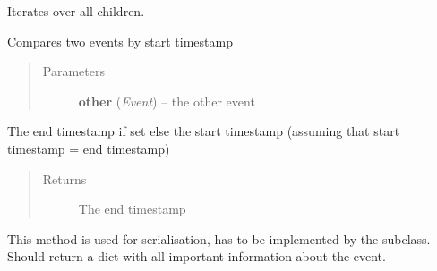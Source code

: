 \documentclass[letterpaper,10pt,english]{sphinxmanual}
\begin{document}
\begin{fulllineitems}
\begin{fulllineitems}
\end{fulllineitems}


\begin{fulllineitems}
\label{ambrosia.model:ambrosia.model.Event.children}
Iterates over all children.

\end{fulllineitems}


\begin{fulllineitems}
\label{ambrosia.model:ambrosia.model.Event.cmp_by_time}
Compares two events by start timestamp
\begin{quote}\begin{description}
\item[{Parameters}] \leavevmode
\textbf{other} (\emph{Event}) -- the other event

\end{description}\end{quote}

\end{fulllineitems}


\begin{fulllineitems}
\label{ambrosia.model:ambrosia.model.Event.end_ts}
The end timestamp if set else the start timestamp (assuming that start timestamp = end timestamp)
\begin{quote}\begin{description}
\item[{Returns}] \leavevmode
The end timestamp

\end{description}\end{quote}

\end{fulllineitems}


\begin{fulllineitems}
\label{ambrosia.model:ambrosia.model.Event.get_serializeable_properties}
This method is used for serialisation, has to be implemented by the subclass. Should return a dict with all
important information about the event.


\end{fulllineitems}
\end{fulllineitems}
\end{document}
